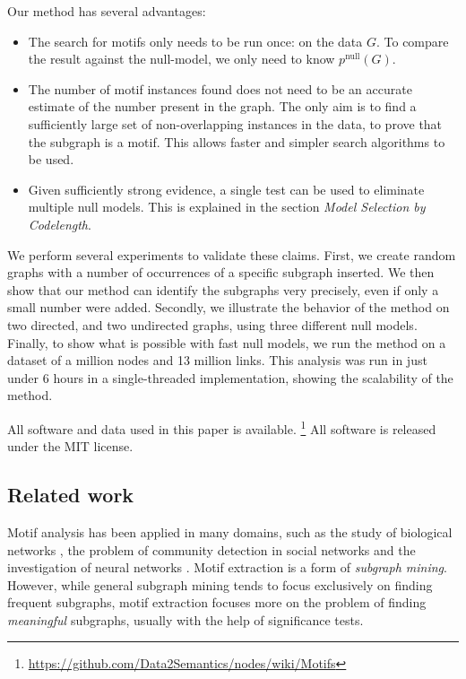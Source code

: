 Our method has several advantages:
\begin{itemize}
  \item The search for motifs only needs to be run once: on the data $G$. To compare the result against the null-model, we only need to know $p^\text{null}(G)$. 
  \item The number of motif instances found does not need to be an accurate estimate of the number present in the graph. The only aim is to find a sufficiently large set of non-overlapping instances in the data, to prove that the subgraph is a motif. This allows faster and simpler search algorithms to be used.
  \item Given sufficiently strong evidence, a single test can be used to eliminate multiple null models. This is explained in the section \emph{Model Selection by Codelength}.
\end{itemize}

We perform several experiments to validate these claims. First, we create random graphs with a number of occurrences of a specific subgraph inserted. We then show that our method can identify the subgraphs very precisely, even if only a small number were added. Secondly, we illustrate the behavior of the method on two directed, and two undirected graphs, using three different null models. Finally, to show what is possible with fast null models, we run the method on a dataset of a million nodes and 13 million links. This analysis was run in just under 6 hours in a single-threaded implementation, showing the scalability of the method. 

All software and data used in this paper is available. \footnote{\url{https://github.com/Data2Semantics/nodes/wiki/Motifs}} All software is released under the MIT license.

\subsection*{Related work}
Motif analysis has been applied in many domains, such as the study of biological networks \cite{wong2012biological}, the problem of community detection in social networks \cite{adamic2008knowledge} and the investigation of neural networks \cite{sporns2004motifs}. Motif extraction is a form of \emph{subgraph mining}. However, while general subgraph mining tends to focus exclusively on finding frequent subgraphs, motif extraction focuses more on the problem of finding \emph{meaningful} subgraphs, usually with the help of significance tests.  

